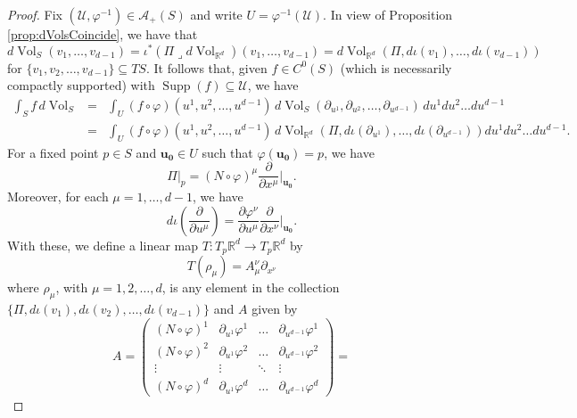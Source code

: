 \documentclass{article}
\newcommand\supp{\operatorname{Supp}}
\newcommand{\p}{\partial}
\newcommand{\R}{\mathbb{R}}
\newcommand{\f}[2]{\frac{#1}{#2}}
\newcommand{\lp}{\left(}
\newcommand{\rp}{\right)}
\newcommand{\iprod}{\mathbin{\lrcorner}}
\theoremstyle{theorem}
\newcommand{\Vol}{\operatorname{Vol}}
\begin{document}
\begin{proof}
Fix $(\mathcal{U}, \varphi^{-1})\in\mathcal{A}_+(S)$ and write $U=\varphi^{-1}(\mathcal{U})$. In view of Proposition \ref{prop:dVolsCoincide}, we have that
\begin{equation*}
    d\Vol_S(v_1,\dots, v_{d-1}) = \iota^*(\Pi \iprod d\Vol_{\R^d})(v_1,\dots, v_{d-1}) = d\Vol_{\R^d}(\Pi, d\iota(v_1),\dots, d\iota(v_{d-1}))
\end{equation*}
for $\{v_1,v_2,\dots,v_{d-1}\} \subseteq TS$. It follows that, given $f\in C^0(S)$ (which is necessarily compactly supported) with $\supp(f)\subseteq \mathcal{U}$, we have
\begin{eqnarray}\label{eq:dVolS}
\int_S f\,d\Vol_S&=&\int_U(f\circ\varphi)(u^1,u^2,\dots,u^{d-1})\,d\Vol_S(\partial_{u^1},\partial_{u^2},\dots,\partial_{u^{d-1}})\,du^1du^2\dots du^{d-1}\nonumber\\
&=& \int_U(f\circ\varphi)(u^1,u^2,\dots,u^{d-1})\,d\Vol_{\R^d}(\Pi, d\iota(\p_{u^1}),  \dots, d\iota(\p_{u^{d-1}}) )du^1du^2\dots du^{d-1}.
\end{eqnarray}
For a fixed point $p\in S$ and $\mathbf{u_0}\in U$ such that $\varphi(\mathbf{u_0}) = p$, we have
\begin{equation*}
    \Pi\bigg\vert_p = (N\circ\varphi)^\mu \f{\p}{\p x^\mu}\bigg\vert_{\mathbf{u_0}}.
\end{equation*}
Moreover, for each $\mu = 1,\dots, d-1$, we have
\begin{equation*}
    d\iota\lp \f{\p}{\p u^\mu} \rp = \f{\p \varphi^\nu}{\p u^\mu} \f{\p}{\p x^\nu}\bigg\vert_{\mathbf{u_0}}.
\end{equation*}
With these, we define a linear map $T: T_p \R^d \to T_p \R^d$ by 
\begin{equation*}
    T(\rho_\mu) = A_\mu^\nu \p_{x^\nu}
\end{equation*}
where $\rho_\mu$, with $\mu = 1,2,\dots,d$, is any element in the collection $\{ \Pi, d\iota(v_1), d\iota(v_2),\dots, d\iota(v_{d-1}) \}$ and $A$ given by 
\begin{equation*}
    A = \begin{pmatrix}
    (N\circ\varphi)^1&\p_{u^1}\varphi^1&\dots&\p_{u^{d-1}} \varphi^{1}\\
    (N\circ\varphi)^2&\p_{u^1}\varphi^2&\dots&\p_{u^{d-1}} \varphi^{2}\\
    \vdots&\vdots&\ddots& \vdots \\
    (N\circ\varphi)^d&\p_{u^1}\varphi^d&\dots&\p_{u^{d-1}} \varphi^{d}
    \end{pmatrix} =

\end{equation*}
\end{proof}
\end{document}
